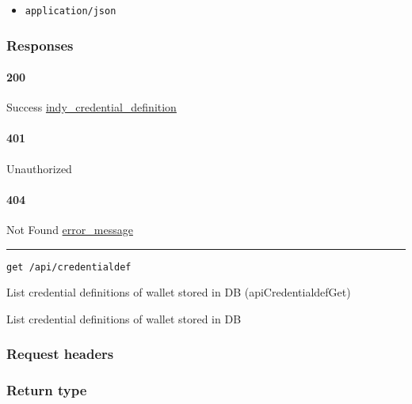 \begin{itemize}
\tightlist
\item
  \texttt{application/json}
\end{itemize}

\hypertarget{responses-32}{%
\subsubsection{Responses}\label{responses-32}}

\hypertarget{section-108}{%
\paragraph{200}\label{section-108}}

Success
\protect\hyperlink{indy_credential_definition}{indy\_credential\_definition}

\hypertarget{section-109}{%
\paragraph{401}\label{section-109}}

Unauthorized \protect\hyperlink{}{}

\hypertarget{section-110}{%
\paragraph{404}\label{section-110}}

Not Found \protect\hyperlink{error_message}{error\_message}

\begin{center}\rule{0.5\linewidth}{\linethickness}\end{center}

\protect\hypertarget{apiCredentialdefGet}{}{}

\begin{verbatim}
get /api/credentialdef
\end{verbatim}

List credential definitions of wallet stored in DB
({apiCredentialdefGet})

List credential definitions of wallet stored in DB

\hypertarget{request-headers-15}{%
\subsubsection{Request headers}\label{request-headers-15}}

\hypertarget{return-type-26}{%
\subsubsection{Return type}\label{return-type-26}}


